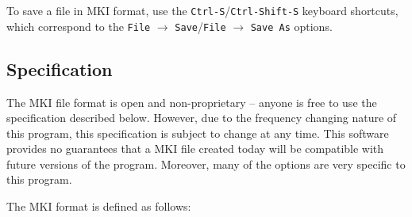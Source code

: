 \documentclass[english]{article}
\providecommand{\mi}[1]{\texttt{#1}}
\begin{document}
To save a file in MKI format, use the \mi{Ctrl-S}/\mi{Ctrl-Shift-S} keyboard shortcuts, which correspond to the 
\mi{File} $\rightarrow$ \mi{Save}/\mi{File} $\rightarrow$ \mi{Save As}
options.

\subsection{Specification}

The MKI file format is open and non-proprietary -- anyone is free to use the specification described below. However,
due to the frequency changing nature of this program, this specification is subject to change at any time. This software
provides no guarantees that a MKI file created today will be compatible with future versions of the program. Moreover,
many of the options are very specific to this program.

The MKI format is defined as follows:

\vspace{1em}
\end{document}
